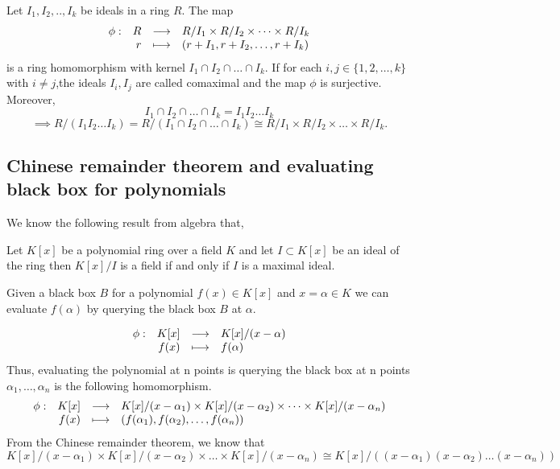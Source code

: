 \begin{theorem}\cite{dummit2003abstract}
  Let $I_{1},I_{2},..,I_{k}$ be ideals in a ring $R$.
The map 
\[
\begin{array}{c r l l }
\phi: & R & \longrightarrow & R/I_{1} \times R/I_{2} \times \dots \times R/I_{k} \\
& r & \longmapsto & (r+I_{1},r+I_{2},\dots,r+I_{k})

\end{array}
\]
is a ring homomorphism with kernel $I_{1} \cap I_{2} \cap \dots \cap I_{k}$. If for each $i,j \in \{1,2,\dots,k\}$ with
$i \neq j$,the ideals $I_{i}, I_{j}$ are called comaximal and the map $\phi$ is surjective. Moreover,
\[
I_{1} \cap I_{2} \cap \dots \cap I_{k}=I_{1}I_{2}\dots I_{k} 
\]
\[
\implies R/(I_{1}I_{2}\dots I_{k})=R/(I_{1}\cap I_{2}\cap \dots\cap I_{k})   \cong R/I_{1} \times R/I_{2} \times \dots \times R/I_{k}.
\]
\end{theorem}

 \subsection{Chinese remainder theorem and evaluating black box for polynomials}
 We know the following result from algebra that,

 \begin{theorem} 
  Let $K[x]$ be a polynomial ring over a field $K$ and let $I \subset K[x]$ be an ideal of the ring 
  then $K[x]/I$ is a field if and only if $I$ is a maximal ideal.
  \end{theorem}
 Given a black box $B$ for a polynomial $f(x) \in K[x]$ and $x=\alpha \in K$ 
 we can evaluate $f(\alpha)$ by querying the black box $B$ at $\alpha$.
 
 \[
 \begin{array}{c r l l }
 \phi: & K[x] & \longrightarrow & K[x]/(x-\alpha) \\
  & f(x) & \longmapsto & f(\alpha)
 \end{array}
 \]
 Thus, evaluating the polynomial at n points is querying the black box at n points
  $\alpha_{1},\dots,\alpha_{n}$ is the following homomorphism.
  \[
  \begin{array}{c r l l }
  \phi: & K[x] & \longrightarrow & K[x]/(x-\alpha_{1}) \times K[x]/(x-\alpha_{2}) \times \dots \times K[x]/(x-\alpha_{n}) \\
   & f(x) & \longmapsto & (f(\alpha_{1}),f(\alpha_{2}),\dots,f(\alpha_{n})) 
    
  \end{array}
  \]
From the Chinese remainder theorem, we know that 
\[
K[x]/(x-\alpha_{1}) \times K[x]/(x-\alpha_{2}) \times \dots \times K[x]/(x-\alpha_{n}) \cong
 K[x]/((x-\alpha_{1})(x-\alpha_{2})\dots(x-\alpha_{n}))
\]

